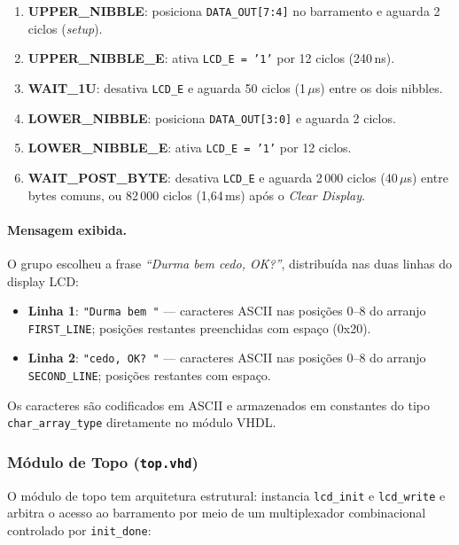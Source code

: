 \documentclass[12pt,a4paper]{article}
\begin{document}
\begin{enumerate}
    \item \textbf{UPPER\_NIBBLE}: posiciona \texttt{DATA\_OUT[7:4]} no barramento e
          aguarda 2 ciclos (\textit{setup}).
    \item \textbf{UPPER\_NIBBLE\_E}: ativa \texttt{LCD\_E = '1'} por 12 ciclos
          (240\,ns).
    \item \textbf{WAIT\_1U}: desativa \texttt{LCD\_E} e aguarda 50 ciclos
          (1\,$\mu$s) entre os dois nibbles.
    \item \textbf{LOWER\_NIBBLE}: posiciona \texttt{DATA\_OUT[3:0]} e aguarda 2 ciclos.
    \item \textbf{LOWER\_NIBBLE\_E}: ativa \texttt{LCD\_E = '1'} por 12 ciclos.
    \item \textbf{WAIT\_POST\_BYTE}: desativa \texttt{LCD\_E} e aguarda 2\,000 ciclos
          (40\,$\mu$s) entre bytes comuns, ou 82\,000 ciclos (1{,}64\,ms) após o
          \textit{Clear Display}.
\end{enumerate}

\paragraph{Mensagem exibida.}
O grupo escolheu a frase \textit{``Durma bem cedo, OK?''}, distribuída nas duas linhas
do display LCD:

\begin{itemize}
    \item \textbf{Linha 1}: \texttt{"Durma bem       "} — caracteres ASCII nas
          posições 0–8 do arranjo \texttt{FIRST\_LINE}; posições restantes preenchidas
          com espaço (0x20).
    \item \textbf{Linha 2}: \texttt{"cedo, OK?       "} — caracteres ASCII nas
          posições 0–8 do arranjo \texttt{SECOND\_LINE}; posições restantes com espaço.
\end{itemize}

Os caracteres são codificados em ASCII e armazenados em constantes do tipo
\texttt{char\_array\_type} diretamente no módulo VHDL.

\subsubsection{Módulo de Topo (\texttt{top.vhd})}

O módulo de topo tem arquitetura estrutural: instancia \texttt{lcd\_init} e
\texttt{lcd\_write} e arbitra o acesso ao barramento por meio de um multiplexador
combinacional controlado por \texttt{init\_done}:
\end{document}
